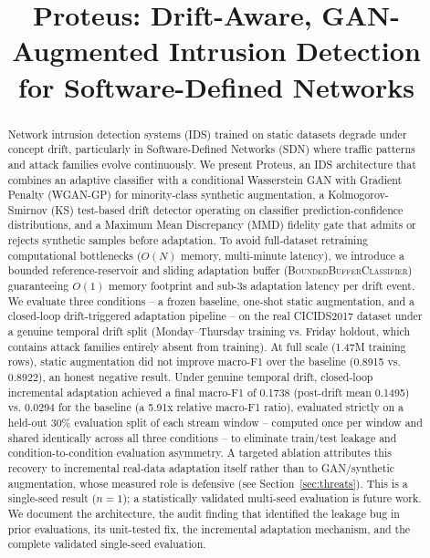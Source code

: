 \documentclass[conference]{IEEEtran}
\begin{document}
\title{Proteus: Drift-Aware, GAN-Augmented Intrusion Detection\\ for Software-Defined Networks}

\author{
}

\maketitle

\begin{abstract}
Network intrusion detection systems (IDS) trained on static datasets degrade under concept
drift, particularly in Software-Defined Networks (SDN) where traffic patterns and attack
families evolve continuously. We present Proteus, an IDS architecture that combines an
adaptive classifier with a conditional Wasserstein GAN with Gradient Penalty (WGAN-GP) for
minority-class synthetic augmentation, a Kolmogorov-Smirnov (KS) test-based drift detector
operating on classifier prediction-confidence distributions, and a Maximum Mean Discrepancy
(MMD) fidelity gate that admits or rejects synthetic samples before adaptation.
To avoid full-dataset retraining computational bottlenecks ($O(N)$ memory, multi-minute latency),
we introduce a bounded reference-reservoir and sliding adaptation buffer (\textsc{BoundedBufferClassifier})
guaranteeing $O(1)$ memory footprint and sub-3s adaptation latency per drift event.
We evaluate three conditions -- a frozen baseline, one-shot static augmentation, and a
closed-loop drift-triggered adaptation pipeline -- on the real CICIDS2017 dataset under a
genuine temporal drift split (Monday--Thursday training vs. Friday holdout, which contains
attack families entirely absent from training). At full scale (1.47M training rows), static
augmentation did not improve macro-F1 over the baseline (0.8915 vs. 0.8922), an honest negative
result. Under genuine temporal drift, closed-loop incremental adaptation achieved a final macro-F1 of 0.1738
(post-drift mean 0.1495) vs. 0.0294 for the baseline (a 5.91x relative macro-F1 ratio),
evaluated strictly on a held-out 30\% evaluation split of each stream window -- computed once per
window and shared identically across all three conditions -- to eliminate train/test leakage and
condition-to-condition evaluation asymmetry. A targeted ablation attributes this recovery to
incremental real-data adaptation itself rather than to GAN/synthetic augmentation, whose measured
role is defensive (see Section~\ref{sec:threats}). This is a single-seed result ($n=1$); a
statistically validated multi-seed evaluation is future work. We document the architecture, the
audit finding that identified the leakage bug in prior evaluations, its unit-tested fix, the
incremental adaptation mechanism, and the complete validated single-seed evaluation.
\end{abstract}
\end{document}
